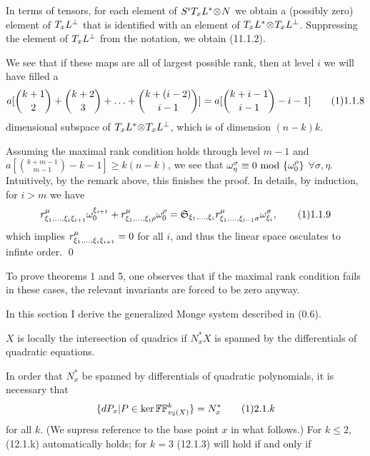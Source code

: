 In terms of tensors, for each element
of $S^iT_xL^*\!\otimes\! N$ we obtain a (possibly zero) element of $T_xL{}^{\perp}$
that is
identified with an element of $T_xL^*\!\otimes\! T_xL{}^{\perp}$.
 Suppressing the element of $T_xL{}^{\perp}$
from the notation,
we obtain   (11.1.2).

We see that if these maps are all of largest possible rank, then at
level $i$ we will have filled a
$$
a[
\binom {k+1}2
 +\binom {{k}+2}3 + \hdots +\binom {{k}+(i-2)}{i-1} ]
 = a[\binom {{k}+i-1}{i-1} -i-1]\tag 11.1.8
$$
dimensional subspace of $T_xL^*\!\otimes\! T_xL{}^{\perp}$, which is of dimension
$(n-k)
 k $.
 
Assuming the maximal rank  condition holds through level $m-1$
and $a[\binom{{k}+m-1}{m-1}-k-1]\geq  {k} (n-k)$, we see
that   $\omega^{\sigma}_{\eta}\equiv 0\text{ mod } \{\omega^{\rho}_0\}$ $\forall \sigma,\eta$.
Intuitively, by the remark above, this finishes the proof. In details,
by induction, for $i>m$ we have 
$$
\rr \mu{\xi_1\hd}{\xi_i}{\xi_{i+1}}\oo{\xi_{i+1}} +
\rr \mu{\xi_1\hd}{\xi_i}\rho\oo\rho =
\frak S_{\xi_1\hd
\xi_i}\rr{\mu}{\xi_1\hd}{\xi_{i-1}}\sigma\ooo\sigma{\xi_i},
\tag 11.1.9
$$
which implies
$r^{\mu}_{{\xi_1, \hdots ,} {\xi_i}{\xi_{i+1}}}=0$
for all $i$, and thus the linear space
osculates to infinte order.
\qed\enddemo

To prove theorems 1 and 5, one observes that if the maximal rank condition
fails in these cases, the relevant invariants are forced to be zero anyway.

 
\endheading

 In this section I derive the generalized Monge system
  described in (0.6).

$X$ is locally the intersection of quadrics if $N^*_xX$ is spanned
by the differentials of quadratic equations.

In order that $N_x^*$ be spanned by differentials of quadratic
polynomials, it is necessary that
$$
\{ dP_x | P\in \tker \bii k\vtwox \} = N_x^*\tag 12.1.k
$$
for all $k$.
(We supress reference to the base
point $x$ in what follows.)
 For $k\leq 2$, (12.1.k) automatically holds; for
$k=3$ (12.1.3) will hold if and only if


